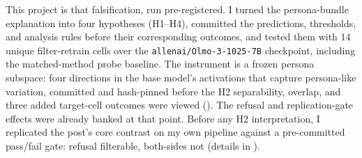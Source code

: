 This project is that falsification, run pre-registered. I turned the
persona-bundle explanation into four hypotheses (H1--H4), committed the
predictions, thresholds, and analysis rules before their corresponding
outcomes, and
tested them with 14 unique filter-retrain cells over the
\texttt{allenai/Olmo-3-1025-7B} checkpoint, including the matched-method
 probe baseline. The instrument is a frozen persona
subspace: four directions in the base model's activations that capture
persona-like variation, committed and hash-pinned before the H2 separability,
overlap, and three added target-cell outcomes were viewed (). The refusal and
 replication-gate effects were already banked at that
point. Before any H2 interpretation, I replicated the post's core contrast
on my own pipeline against a pre-committed pass/fail gate: refusal filterable,
both-sides not (details in ).
